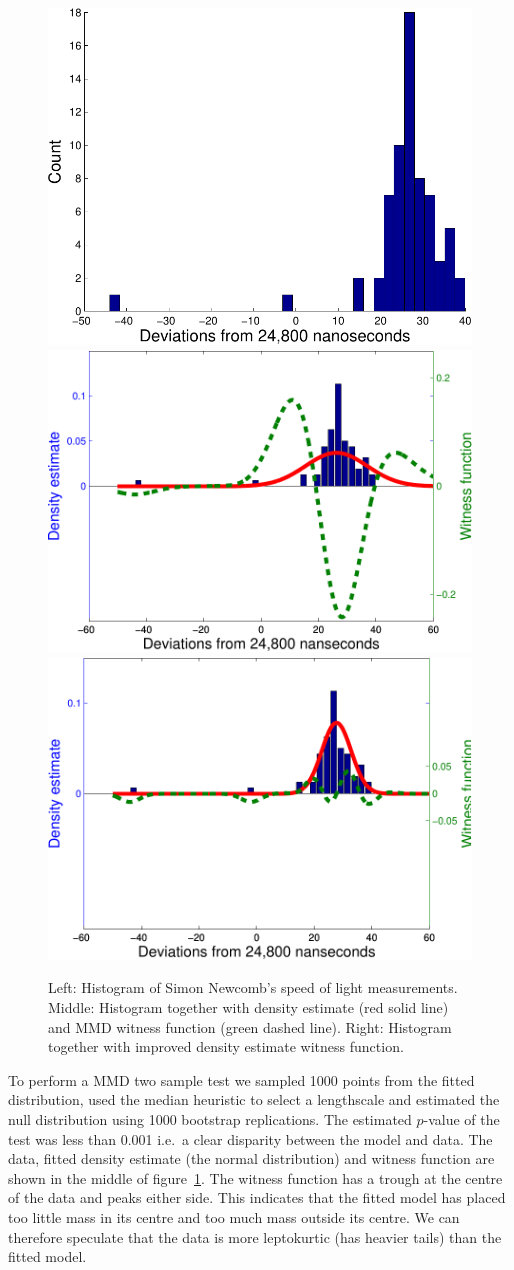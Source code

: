 \documentclass{article} %
\def\ie{i.e.\ }
\begin{document}
\begin{figure}[ht]
\centering
\includegraphics[width=0.32\columnwidth]{figures/newcomb_hist}
\includegraphics[width=0.32\columnwidth]{figures/newcomb_witness_1}
\includegraphics[width=0.32\columnwidth]{figures/newcomb_witness_2}
\caption{
Left: Histogram of Simon Newcomb's speed of light measurements.
Middle: Histogram together with density estimate (red solid line) and MMD witness function (green dashed line).
Right: Histogram together with improved density estimate witness function.
}
\label{fig:newcomb}
\end{figure}

To perform a MMD two sample test we sampled 1000 points from the fitted distribution, used the median heuristic to select a lengthscale and estimated the null distribution using 1000 bootstrap replications.
The estimated $p$-value of the test was less than 0.001 \ie a clear disparity between the model and data.
The data, fitted density estimate (the normal distribution) and witness function are shown in the middle of figure~\ref{fig:newcomb}.
The witness function has a trough at the centre of the data and peaks either side.
This indicates that the fitted model has placed too little mass in its centre and too much mass outside its centre.
We can therefore speculate that the data is more leptokurtic (has heavier tails) than the fitted model.
\end{document}
